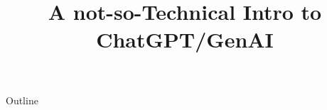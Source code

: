 \documentclass[xcolor=dvipsnames,compress,t,pdf,9pt]{beamer}
\title[\insertframenumber /\inserttotalframenumber]{A not-so-Technical Intro to ChatGPT/GenAI} %
\begin{document}
	\begin{frame}
	\titlepage
	\end{frame}
	
	\begin{frame}{Outline}
	    \tableofcontents
	\end{frame}

	
	
	
\end{document}
